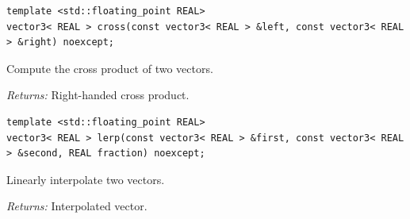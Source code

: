 \par\noindent\begin{minipage}{\linewidth}
\begin{lstlisting}[style=apireference]
template <std::floating_point REAL>
vector3< REAL > cross(const vector3< REAL > &left, const vector3< REAL > &right) noexcept;
\end{lstlisting}
{\footnotesize Compute the cross product of two vectors.\par}
{\footnotesize\textit{Returns:} Right-handed cross product.\par}
\end{minipage}\par\vspace{1pt}
\par\noindent\begin{minipage}{\linewidth}
\begin{lstlisting}[style=apireference]
template <std::floating_point REAL>
vector3< REAL > lerp(const vector3< REAL > &first, const vector3< REAL > &second, REAL fraction) noexcept;
\end{lstlisting}
{\footnotesize Linearly interpolate two vectors.\par}
{\footnotesize\textit{Returns:} Interpolated vector.\par}
\end{minipage}\par\vspace{1pt}
\endgroup
